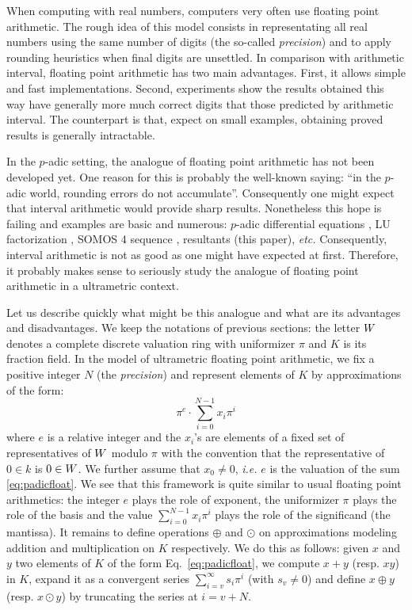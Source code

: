 \documentclass{sig-alternate}
\begin{document}
When computing with real numbers, computers very often use floating 
point arithmetic. 
The rough idea of this model consists in representating all real numbers 
using the same number of digits (the so-called \emph{precision}) and to
apply rounding heuristics when final digits are unsettled.
In comparison with arithmetic interval, floating point arithmetic has
two main advantages. First, it allows simple and fast implementations.
Second, experiments show the results obtained this way have generally
more much correct digits that those predicted by arithmetic interval.
The counterpart is that, expect on small examples, obtaining proved
results is generally intractable.

In the $p$-adic setting, the analogue of floating point arithmetic has 
not been developed yet. One reason for this is probably the well-known 
saying: ``in the $p$-adic world, rounding errors do not accumulate''. 
Consequently one might expect that interval arithmetic would provide 
sharp results. Nonetheless this hope is failing and examples are basic 
and numerous: $p$-adic differential equations \cite{bostan, padicdiff}, 
LU factorization \cite{LU}, SOMOS 4 sequence \cite{padicprec}, 
resultants (this paper), \emph{etc.} Consequently, interval arithmetic 
is not as good as one might have expected at first. Therefore, it 
probably makes sense to seriously study the analogue of floating point 
arithmetic in a ultrametric context.

\medskip

Let us describe quickly what might be this analogue and what are its
advantages and disadvantages. We keep the notations of previous
sections: the letter $W$ denotes a complete discrete valuation ring
with uniformizer $\pi$ and $K$ is its fraction field.
In the model of ultrametric floating point arithmetic, we fix a
positive integer $N$ (the \emph{precision}) and represent elements 
of $K$ by approximations of the form:
\begin{equation}
\label{eq:padicfloat}
\pi^e \cdot \sum_{i=0}^{N-1} x_i \pi^i
\end{equation}
where $e$ is a relative integer and the $x_i$'s are elements of a fixed 
set of representatives of $W$ modulo $\pi$ with the convention that the 
representative of $0 \in k$ is $0 \in W$.
We further assume that $x_0 \neq 0$, \emph{i.e.} $e$ is the valuation
of the sum \eqref{eq:padicfloat}. We see that this framework is quite
similar to usual floating point arithmetics: the integer $e$ plays the
role of exponent, the uniformizer $\pi$ plays the role of the basis
and the value $\sum_{i=0}^{N-1} x_i \pi^i$ plays the role of the
significand (the mantissa). It remains to define operations $\oplus$
and $\odot$ on approximations modeling addition and multiplication
on $K$ respectively. We do this as follows: given $x$ and $y$ two
elements of $K$ of the form Eq.~\eqref{eq:padicfloat}, we compute
$x+y$ (resp. $xy$) in $K$, expand it as a convergent series 
$\sum_{i=v}^{\infty} s_i \pi^i$ (with $s_v \neq 0$) and define $x 
\oplus y$ (resp. $x \odot y$) by truncating the series at $i = v+N$.
\end{document}
